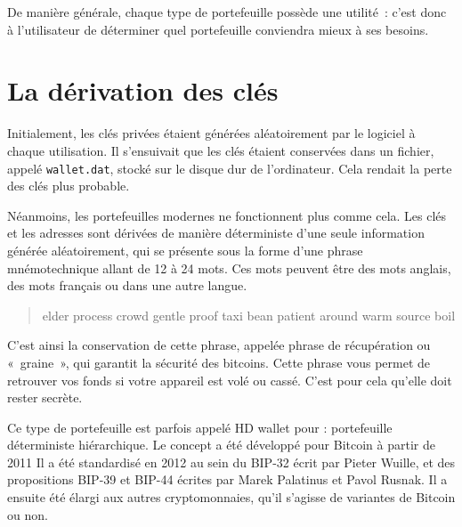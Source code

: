 De manière générale, chaque type de portefeuille possède une utilité~: c'est donc à l'utilisateur de déterminer quel portefeuille conviendra mieux à ses besoins.

\section{La dérivation des clés}


Initialement, les clés privées étaient générées aléatoirement par le logiciel à chaque utilisation. Il s'ensuivait que les clés étaient conservées dans un fichier, appelé \verb?wallet.dat?, stocké sur le disque dur de l'ordinateur. Cela rendait la perte des clés plus probable.

Néanmoins, les portefeuilles modernes ne fonctionnent plus comme cela. Les clés et les adresses sont dérivées de manière déterministe d'une seule information générée aléatoirement, qui se présente sous la forme d'une phrase mnémotechnique allant de 12 à 24 mots. Ces mots peuvent être des mots anglais, des mots français ou dans une autre langue.


\begin{quote}
elder process crowd gentle proof taxi bean patient around warm source boil
\end{quote}

C'est ainsi la conservation de cette phrase, appelée phrase de récupération ou «~graine~», qui garantit la sécurité des bitcoins. Cette phrase vous permet de retrouver vos fonds si votre appareil est volé ou cassé. C'est pour cela qu'elle doit rester secrète.

Ce type de portefeuille est parfois appelé HD wallet pour  : portefeuille déterministe hiérarchique. Le concept a été développé pour Bitcoin à partir de 2011 Il a été standardisé en 2012 au sein du BIP-32 écrit par Pieter Wuille, et des propositions BIP-39 et BIP-44 écrites par Marek Palatinus et Pavol Rusnak. Il a ensuite été élargi aux autres cryptomonnaies, qu'il s'agisse de variantes de Bitcoin ou non. 

